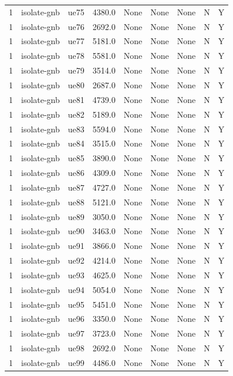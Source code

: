 \begin{table}[ht]
\begin{tabular}{|c|c|c|c|c|c|c|c|c|}
1 & isolate-gnb & ue75 & 4380.0 & None & None & None & N & Y \\
1 & isolate-gnb & ue76 & 2692.0 & None & None & None & N & Y \\
1 & isolate-gnb & ue77 & 5181.0 & None & None & None & N & Y \\
1 & isolate-gnb & ue78 & 5581.0 & None & None & None & N & Y \\
1 & isolate-gnb & ue79 & 3514.0 & None & None & None & N & Y \\
1 & isolate-gnb & ue80 & 2687.0 & None & None & None & N & Y \\
1 & isolate-gnb & ue81 & 4739.0 & None & None & None & N & Y \\
1 & isolate-gnb & ue82 & 5189.0 & None & None & None & N & Y \\
1 & isolate-gnb & ue83 & 5594.0 & None & None & None & N & Y \\
1 & isolate-gnb & ue84 & 3515.0 & None & None & None & N & Y \\
1 & isolate-gnb & ue85 & 3890.0 & None & None & None & N & Y \\
1 & isolate-gnb & ue86 & 4309.0 & None & None & None & N & Y \\
1 & isolate-gnb & ue87 & 4727.0 & None & None & None & N & Y \\
1 & isolate-gnb & ue88 & 5121.0 & None & None & None & N & Y \\
1 & isolate-gnb & ue89 & 3050.0 & None & None & None & N & Y \\
1 & isolate-gnb & ue90 & 3463.0 & None & None & None & N & Y \\
1 & isolate-gnb & ue91 & 3866.0 & None & None & None & N & Y \\
1 & isolate-gnb & ue92 & 4214.0 & None & None & None & N & Y \\
1 & isolate-gnb & ue93 & 4625.0 & None & None & None & N & Y \\
1 & isolate-gnb & ue94 & 5054.0 & None & None & None & N & Y \\
1 & isolate-gnb & ue95 & 5451.0 & None & None & None & N & Y \\
1 & isolate-gnb & ue96 & 3350.0 & None & None & None & N & Y \\
1 & isolate-gnb & ue97 & 3723.0 & None & None & None & N & Y \\
1 & isolate-gnb & ue98 & 2692.0 & None & None & None & N & Y \\
1 & isolate-gnb & ue99 & 4486.0 & None & None & None & N & Y \\

\end{tabular}
\end{table}
